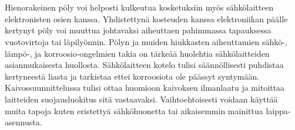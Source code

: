 \documentclass[finnish,12pt,a4paper,pdftex,elec,utf8]{aaltothesis}
\begin{document}
\\\\
Hienorakeinen pöly voi helposti kulkeutua kosketuksiin myös sähkölaitteen elektronisten osien kanssa. Yhdistettynä kosteuden kanssa elektroniikan päälle kertynyt pöly voi muuttua johtavaksi aiheuttaen pahimmassa tapauksessa vuotovirtoja tai läpilyönnin. \cite{Pallasmaa} Pölyn ja muiden hiukkasten aiheuttamien sähkö-, lämpö-, ja korroosio-ongelmien takia on tärkeää huolehtia sähkölaitteiden asianmukaisesta huollosta. Sähkölaitteen kotelo tulisi säännöllisesti puhdistaa kertyneestä liasta ja tarkistaa ettei korroosiota ole päässyt syntymään. Kaivossuunnittelussa tulisi ottaa huomioon kaivoksen ilmanlaatu ja mitoittaa laitteiden suojausluokitus sitä vastaavaksi. Vaihtoehtoisesti voidaan käyttää muita tapoja kuten eristettyä sähköhuonetta tai aikaisemmin mainittua laippa-asennusta.

\end{document}
